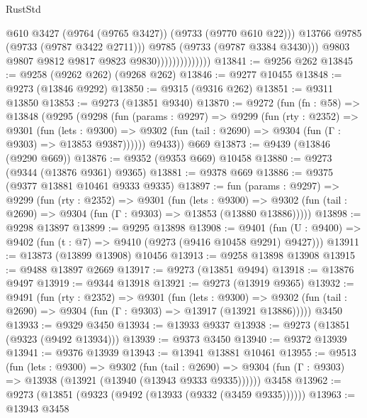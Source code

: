 \begin{lexlean}{RustStd}
\begin{coremodule}
{\begin{coremodule}
{{{{{{{{{{{{{{{{{{{{{{{{{{{{{{{{{{{{{{{{{{{{{{{{{{{{{{{                                      @610
                                      @3427
                                      (@9764 (@9765 @3427))
                                      (@9733 (@9770 @610 @22)))
                                    @13766
                                    @9785
                                    (@9733 (@9787 @3422 @2711)))
                                  @9785
                                  (@9733 (@9787 @3384 @3430)))
                                @9803
                                @9807
                                @9812
                                @9817
                                @9823
                                @9830))))))))))))))
@13841 := @9256 @262
@13845 := @9258 (@9262 @262) (@9268 @262)
@13846 := @9277 @10455
@13848 := @9273 (@13846 @9292)
@13850 := @9315 (@9316 @262)
@13851 := @9311 @13850
@13853 := @9273 (@13851 @9340)
@13870 := @9272
    (fun (fn : @58) =>
    @13848
      (@9295
        (@9298
          (fun (params : @9297) =>
          @9299
            (fun (rty : @2352) =>
            @9301
              (fun (lets : @9300) =>
              @9302 (fun (tail : @2690) => @9304 (fun (Γ : @9303) => @13853 @9387))))))
        @9433))
    @669
@13873 := @9439 (@13846 (@9290 @669))
@13876 := @9352 (@9353 @669) @10458
@13880 := @9273 (@9344 (@13876 @9361) @9365)
@13881 := @9378 @669
@13886 := @9375 (@9377 @13881 @10461 @9333 @9335)
@13897 := fun (params : @9297) =>
  @9299
    (fun (rty : @2352) =>
    @9301
      (fun (lets : @9300) =>
      @9302 (fun (tail : @2690) => @9304 (fun (Γ : @9303) => @13853 (@13880 @13886)))))
@13898 := @9298 @13897
@13899 := @9295 @13898
@13908 := @9401
    (fun (U : @9400) => @9402 (fun (t : @7) => @9410 (@9273 (@9416 @10458 @9291) @9427)))
@13911 := @13873 (@13899 @13908) @10456
@13913 := @9258 @13898 @13908
@13915 := @9488 @13897 @2669
@13917 := @9273 (@13851 @9494)
@13918 := @13876 @9497
@13919 := @9344 @13918
@13921 := @9273 (@13919 @9365)
@13932 := @9491
    (fun (rty : @2352) =>
    @9301
      (fun (lets : @9300) =>
      @9302 (fun (tail : @2690) => @9304 (fun (Γ : @9303) => @13917 (@13921 @13886)))))
    @3450
@13933 := @9329 @3450
@13934 := @13933 @9337
@13938 := @9273 (@13851 (@9323 (@9492 @13934)))
@13939 := @9373 @3450
@13940 := @9372 @13939
@13941 := @9376 @13939
@13943 := @13941 @13881 @10461
@13955 := @9513
    (fun (lets : @9300) =>
    @9302
      (fun (tail : @2690) =>
      @9304 (fun (Γ : @9303) => @13938 (@13921 (@13940 (@13943 @9333 @9335))))))
    @3458
@13962 := @9273 (@13851 (@9323 (@9492 (@13933 (@9332 (@3459 @9335))))))
@13963 := @13943 @3458
}}}}}}}}}}}}}}}}}}}}}}}}}}}}}}}}}}}}}}}}}}}}}}}}}}}}}}}
\end{coremodule}}
\end{coremodule}
\end{lexlean}
